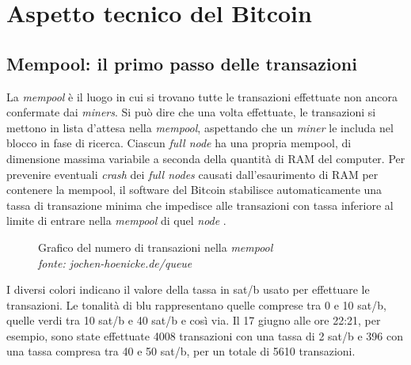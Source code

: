 \documentclass {article}
\begin{document}
\newpage
\null
\newpage


\section {Aspetto tecnico del Bitcoin}


\subsection {Mempool: il primo passo delle transazioni}


La \textit{mempool} è il luogo in cui si trovano tutte le transazioni effettuate non ancora confermate dai \textit{miners}.
Si può dire che una volta effettuate, le transazioni si mettono in lista d'attesa nella \textit{mempool}, aspettando che un \textit{miner} le includa nel blocco in fase di ricerca.
Ciascun \textit{full node} ha una propria mempool, di dimensione massima variabile a seconda della quantità di RAM del computer.
Per prevenire eventuali \textit{crash} dei \textit{full nodes} causati dall'esaurimento di RAM per contenere la mempool, il software del Bitcoin stabilisce automaticamente una tassa di transazione minima che impedisce alle transazioni con tassa inferiore al limite di entrare nella \textit{mempool} di quel \textit{node} \cite{mempool}.

\vspace {0.5cm}
\begin{figure}[htb!]
\captionsetup{width=1.4\linewidth}
\caption {Grafico del numero di transazioni nella \textit{mempool}\\\textit{fonte: jochen-hoenicke.de/queue}}
\end{figure}
\vspace {0.2cm}
\noindent
%
I diversi colori indicano il valore della tassa in sat/b usato per effettuare le transazioni.
Le tonalità di blu rappresentano quelle comprese tra 0 e 10 sat/b, quelle verdi tra 10 sat/b e 40 sat/b e così via.
Il 17 giugno alle ore 22:21, per esempio, sono state effettuate 4008 transazioni con una tassa di 2 sat/b e 396 con una tassa compresa tra 40 e 50 sat/b, per un totale di 5610 transazioni.
\end{document}
